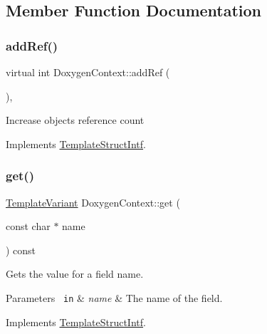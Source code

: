 \subsection{Member Function Documentation}
\mbox{\label{class_doxygen_context_a354b9dc7833167a7028074acf11d0974}} 
\subsubsection{\texorpdfstring{addRef()}{addRef()}}
{\footnotesize\ttfamily virtual int Doxygen\+Context\+::add\+Ref (\begin{DoxyParamCaption}{ }\end{DoxyParamCaption})\hspace{0.3cm}{\ttfamily [inline]}, {\ttfamily [virtual]}}

Increase object\textquotesingle{}s reference count 

Implements \mbox{\hyperlink{class_template_struct_intf_a05fe97ad47633beb326f69686faed581}{Template\+Struct\+Intf}}.

\mbox{\label{class_doxygen_context_ad445e6fcda58749dc680b223b7e5ea2a}} 
\subsubsection{\texorpdfstring{get()}{get()}}
{\footnotesize\ttfamily \mbox{\hyperlink{class_template_variant}{Template\+Variant}} Doxygen\+Context\+::get (\begin{DoxyParamCaption}\item[{const char $\ast$}]{name }\end{DoxyParamCaption}) const\hspace{0.3cm}{\ttfamily [virtual]}}

Gets the value for a field name. 
\begin{DoxyParams}[1]{Parameters}
\mbox{\texttt{ in}}  & {\em name} & The name of the field. \\
\hline
\end{DoxyParams}


Implements \mbox{\hyperlink{class_template_struct_intf_a3d610cb81b4adbb531ebed3aa3d09b51}{Template\+Struct\+Intf}}.

